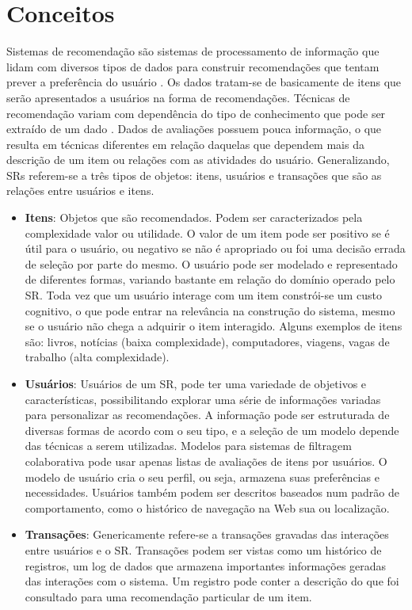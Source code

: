 \section{Conceitos}
\label{sec:conceitosSistemaRecomendacao}

Sistemas de recomendação são sistemas de processamento de informação que lidam com diversos tipos de dados para construir recomendações que tentam prever a preferência do usuário \citep{Ricci2011}.  Os dados tratam-se de basicamente de itens que serão apresentados a usuários na forma de recomendações. Técnicas de recomendação variam com dependência do tipo de conhecimento que pode ser extraído de um dado \citep{Ricci2011}. Dados de avaliações possuem pouca informação, o que resulta em técnicas diferentes em relação daquelas que dependem mais da descrição de um item ou relações com as atividades do usuário. Generalizando, SRs referem-se a três tipos de objetos: itens, usuários e transações que são as relações entre usuários e itens.

\begin{itemize}
	\item{\textbf{Itens}: Objetos que são recomendados. Podem ser caracterizados pela complexidade valor ou utilidade. O valor de um item pode ser positivo se é útil para o usuário, ou negativo se não é apropriado ou foi uma decisão errada de seleção por parte do mesmo. O usuário pode ser modelado e representado de diferentes formas, variando bastante em relação do domínio operado pelo SR. Toda vez que um usuário interage com um item constrói-se um custo cognitivo, o que pode entrar na relevância na construção do sistema, mesmo se o usuário não chega a adquirir o item interagido. Alguns exemplos de itens são: livros, notícias (baixa complexidade), computadores, viagens, vagas de trabalho (alta complexidade).}

	\item{\textbf{Usuários}: Usuários de um SR, pode ter uma variedade de objetivos e características, possibilitando explorar uma série de informações variadas para personalizar as recomendações. A informação pode ser estruturada de diversas formas de acordo com o seu tipo, e a seleção de um modelo depende das técnicas a serem utilizadas. Modelos para sistemas de filtragem colaborativa pode usar apenas listas de avaliações de itens por usuários. O modelo de usuário cria o seu perfil, ou seja, armazena suas preferências e necessidades. Usuários também podem ser descritos baseados num padrão de comportamento, como o histórico de navegação na Web sua ou localização.}

	\item{\textbf{Transações}: Genericamente refere-se a transações gravadas das interações entre usuários e o SR. Transações podem ser vistas como um histórico de registros, um log de dados que armazena importantes informações geradas das interações com o sistema. Um registro pode conter a descrição do que foi consultado para uma recomendação particular de um item.}
\end{itemize}

